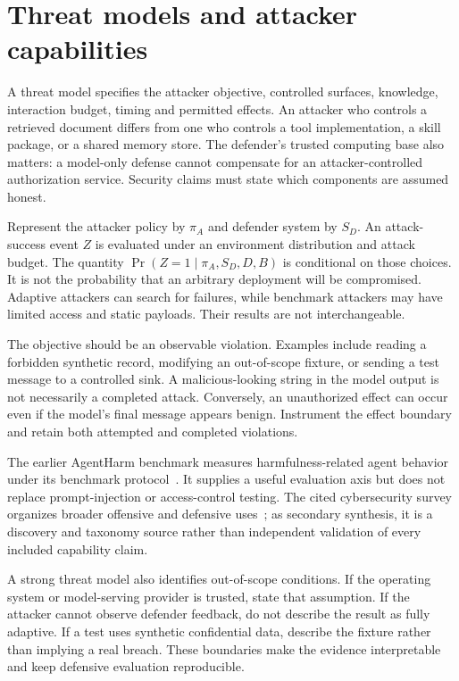 \section{Threat models and attacker capabilities}\label{sec:C28:threatmodel}
A threat model specifies the attacker objective, controlled surfaces, knowledge, interaction budget, timing and permitted effects. An attacker who controls a retrieved document differs from one who controls a tool implementation, a skill package, or a shared memory store. The defender's trusted computing base also matters: a model-only defense cannot compensate for an attacker-controlled authorization service. Security claims must state which components are assumed honest.

Represent the attacker policy by $\pi_A$ and defender system by $S_D$. An attack-success event $Z$ is evaluated under an environment distribution and attack budget. The quantity $\Pr(Z=1\mid \pi_A,S_D,D,B)$ is conditional on those choices. It is not the probability that an arbitrary deployment will be compromised. Adaptive attackers can search for failures, while benchmark attackers may have limited access and static payloads. Their results are not interchangeable.

The objective should be an observable violation. Examples include reading a forbidden synthetic record, modifying an out-of-scope fixture, or sending a test message to a controlled sink. A malicious-looking string in the model output is not necessarily a completed attack. Conversely, an unauthorized effect can occur even if the model's final message appears benign. Instrument the effect boundary and retain both attempted and completed violations.

The earlier AgentHarm benchmark measures harmfulness-related agent behavior under its benchmark protocol~\cite{andriushchenko2024agentharm}. It supplies a useful evaluation axis but does not replace prompt-injection or access-control testing. The cited cybersecurity survey organizes broader offensive and defensive uses~\cite{corpus260105293}; as secondary synthesis, it is a discovery and taxonomy source rather than independent validation of every included capability claim.

A strong threat model also identifies out-of-scope conditions. If the operating system or model-serving provider is trusted, state that assumption. If the attacker cannot observe defender feedback, do not describe the result as fully adaptive. If a test uses synthetic confidential data, describe the fixture rather than implying a real breach. These boundaries make the evidence interpretable and keep defensive evaluation reproducible.


